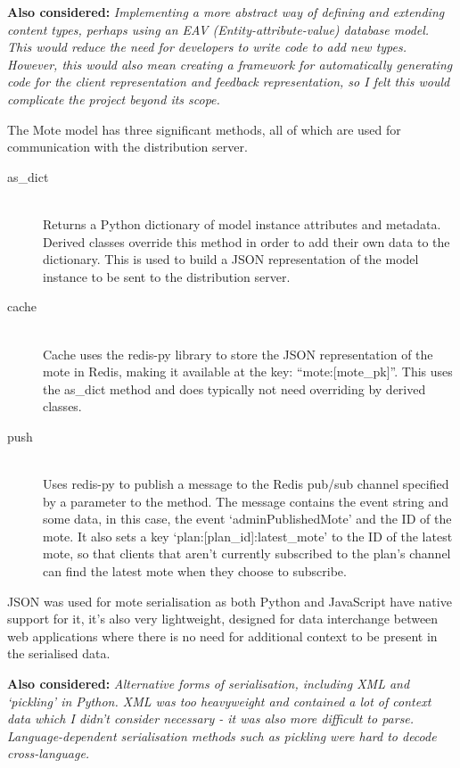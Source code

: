 \documentclass[a4papert,11pt,notitlepage]{ltxdoc}
\begin{document}
\textbf{Also considered:} \emph{Implementing a more abstract way of defining and extending content types, perhaps using an EAV (Entity-attribute-value) database model. This would reduce the need for developers to write code to add new types. However, this would also mean creating a framework for automatically generating code for the client representation and feedback representation, so I felt this would complicate the project beyond its scope.}

The Mote model has three significant methods, all of which are used for communication with the distribution server.
\begin{description}
\item[as\_dict] \hfill \\
Returns a Python dictionary of model instance attributes and metadata. Derived classes override this method in order to add their own data to the dictionary. This is used to build a JSON representation of the model instance to be sent to the distribution server.
\item[cache] \hfill \\
Cache uses the redis-py\cite{redispy:web} library to store the JSON representation of the mote in Redis, making it available at the key: ``mote:{[}mote\_pk{]}''. This uses the as\_dict method and does typically not need overriding by derived classes.
\item[push] \hfill \\
Uses redis-py to publish a message to the Redis pub/sub channel specified by a parameter to the method. The message contains the event string and some data, in this case, the event `adminPublishedMote' and the ID of the mote. It also sets a key `plan:{[}plan\_id{]}:latest\_mote' to the ID of the latest mote, so that clients that aren't currently subscribed to the plan's channel can find the latest mote when they choose to subscribe.
\end{description}

JSON was used for mote serialisation as both Python and JavaScript have native support for it, it's also very lightweight, designed for data interchange between web applications where there is no need for additional context to be present in the serialised data.

\textbf{Also considered:} \emph{Alternative forms of serialisation, including XML and `pickling' in Python. XML was too heavyweight and contained a lot of context data which I didn't consider necessary - it was also more difficult to parse. Language-dependent serialisation methods such as pickling were hard to decode cross-language.}
\end{document}
